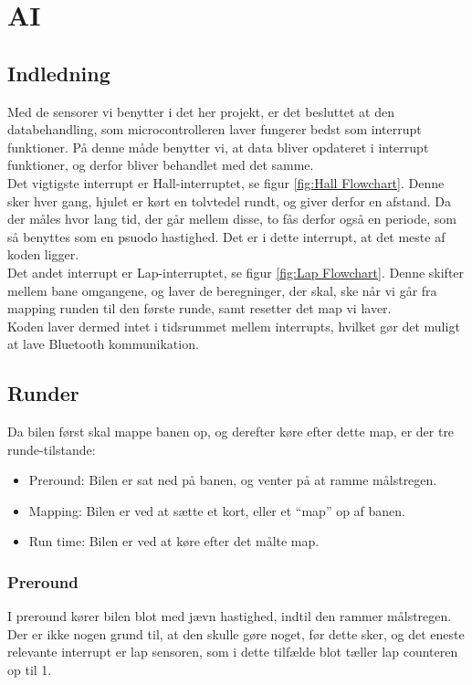 \section{AI}


\subsection{Indledning}
Med de sensorer vi benytter i det her projekt, er det besluttet at den databehandling, som microcontrolleren laver fungerer bedst som interrupt funktioner. På denne måde benytter vi, at data bliver opdateret i interrupt funktioner, og derfor bliver behandlet med det samme.
\\

Det vigtigste interrupt er Hall-interruptet, se figur \ref{fig:Hall Flowchart}. Denne sker hver gang, hjulet er kørt en tolvtedel rundt, og giver derfor en afstand. Da der måles hvor lang tid, der går mellem disse, to fås derfor også en periode, som så benyttes som en psuodo hastighed. Det er i dette interrupt, at det meste af koden ligger.
\\

Det andet interrupt er Lap-interruptet, se figur \ref{fig:Lap Flowchart}. Denne skifter mellem bane omgangene, og laver de beregninger, der skal, ske når vi går fra mapping runden til den første runde, samt resetter det map vi laver.
\\

Koden laver dermed intet  i tidsrummet mellem interrupts, hvilket gør det muligt at lave Bluetooth kommunikation.

\subsection{Runder}

Da bilen først skal mappe banen op, og derefter køre efter dette map, er der tre runde-tilstande:

\begin{itemize}
\item Preround: Bilen er sat ned på banen, og venter på at ramme målstregen.
\item Mapping: Bilen er ved at sætte et kort, eller et ``map'' op af banen.
\item Run time: Bilen er ved at køre efter det målte map.
\end{itemize}

\subsubsection{Preround}
I preround kører bilen blot med jævn hastighed, indtil den rammer målstregen. Der er ikke nogen grund til, at den skulle gøre noget, før dette sker, og det eneste relevante interrupt er lap sensoren, som i dette tilfælde blot tæller lap counteren op til 1.

